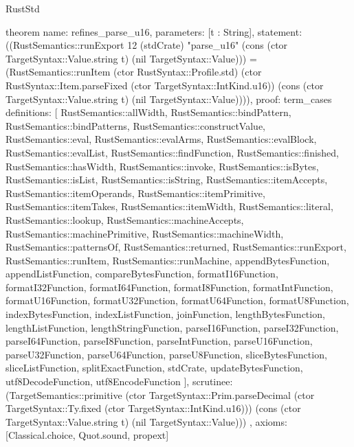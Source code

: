 \begin{lexlean}{RustStd}
\begin{semanticmodule}
theorem{
  name: refines_parse_u16,
  parameters: [t : String],
  statement: ((RustSemantics::runExport 12 (stdCrate) "parse_u16" (cons (ctor TargetSyntax::Value.string t) (nil TargetSyntax::Value))) = (RustSemantics::runItem (ctor RustSyntax::Profile.std) (ctor RustSyntax::Item.parseFixed (ctor TargetSyntax::IntKind.u16)) (cons (ctor TargetSyntax::Value.string t) (nil TargetSyntax::Value)))),
  proof: term_cases{
    definitions: [
      RustSemantics::allWidth,
      RustSemantics::bindPattern,
      RustSemantics::bindPatterns,
      RustSemantics::constructValue,
      RustSemantics::eval,
      RustSemantics::evalArms,
      RustSemantics::evalBlock,
      RustSemantics::evalList,
      RustSemantics::findFunction,
      RustSemantics::finished,
      RustSemantics::hasWidth,
      RustSemantics::invoke,
      RustSemantics::isBytes,
      RustSemantics::isList,
      RustSemantics::isString,
      RustSemantics::itemAccepts,
      RustSemantics::itemOperands,
      RustSemantics::itemPrimitive,
      RustSemantics::itemTakes,
      RustSemantics::itemWidth,
      RustSemantics::literal,
      RustSemantics::lookup,
      RustSemantics::machineAccepts,
      RustSemantics::machinePrimitive,
      RustSemantics::machineWidth,
      RustSemantics::patternsOf,
      RustSemantics::returned,
      RustSemantics::runExport,
      RustSemantics::runItem,
      RustSemantics::runMachine,
      appendBytesFunction,
      appendListFunction,
      compareBytesFunction,
      formatI16Function,
      formatI32Function,
      formatI64Function,
      formatI8Function,
      formatIntFunction,
      formatU16Function,
      formatU32Function,
      formatU64Function,
      formatU8Function,
      indexBytesFunction,
      indexListFunction,
      joinFunction,
      lengthBytesFunction,
      lengthListFunction,
      lengthStringFunction,
      parseI16Function,
      parseI32Function,
      parseI64Function,
      parseI8Function,
      parseIntFunction,
      parseU16Function,
      parseU32Function,
      parseU64Function,
      parseU8Function,
      sliceBytesFunction,
      sliceListFunction,
      splitExactFunction,
      stdCrate,
      updateBytesFunction,
      utf8DecodeFunction,
      utf8EncodeFunction
    ],
    scrutinee: (TargetSemantics::primitive (ctor TargetSyntax::Prim.parseDecimal (ctor TargetSyntax::Ty.fixed (ctor TargetSyntax::IntKind.u16))) (cons (ctor TargetSyntax::Value.string t) (nil TargetSyntax::Value)))
  },
  axioms: [Classical.choice, Quot.sound, propext]
}


\end{semanticmodule}
\end{lexlean}
